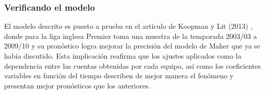   
 

 
 
 
%
\subsubsection{Verificando el modelo}
\label{subsubsec:verificando}

El modelo descrito es puesto a prueba en el artículo de Koopman y Lit (2013) \cite{koopman2013dynamic}, donde para la liga inglesa Premier toma una muestra de la temporada 2003/03 a 2009/10 y su pronóstico logra mejorar la precisión del modelo de Maher \cite{maher1982modelling} que ya se había discutido. Esta implicación reafirma que los ajustes aplicados como la dependencia entre las cuentas obtenidas por cada equipo, así como los coeficientes variables en función del tiempo describen de mejor manera el fenómeno y presentan mejor pronósticos que los anteriores.

